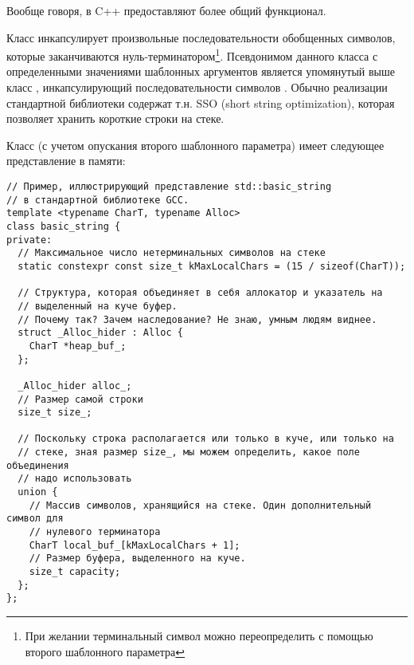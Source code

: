 Вообще говоря, в C++  предоставляют более общий функционал.

Класс  инкапсулирует произвольные последовательности
обобщенных символов, которые заканчиваются нуль-терминатором\footnote{При желании терминальный символ можно
переопределить с помощью второго шаблонного параметра}. Псевдонимом данного класса с определенными значениями
шаблонных аргументов является упомянутый выше класс ,
инкапсулирующий последовательности символов . Обычно реализации
стандартной библиотеки содержат т.н. SSO (short string optimization), которая позволяет хранить короткие строки на стеке.

Класс  (с учетом опускания второго шаблонного параметра) имеет следующее представление в памяти:
\begin{verbatim}
// Пример, иллюстрирующий представление std::basic_string
// в стандартной библиотеке GCC.
template <typename CharT, typename Alloc>
class basic_string {
private:
  // Максимальное число нетерминальных символов на стеке
  static constexpr const size_t kMaxLocalChars = (15 / sizeof(CharT));

  // Структура, которая объединяет в себя аллокатор и указатель на
  // выделенный на куче буфер.
  // Почему так? Зачем наследование? Не знаю, умным людям виднее.
  struct _Alloc_hider : Alloc {
    CharT *heap_buf_;
  };

  _Alloc_hider alloc_;
  // Размер самой строки
  size_t size_;

  // Поскольку строка располагается или только в куче, или только на
  // стеке, зная размер size_, мы можем определить, какое поле объединения
  // надо использовать
  union {
    // Массив символов, хранящийся на стеке. Один дополнительный символ для 
    // нулевого терминатора
    CharT local_buf_[kMaxLocalChars + 1];
    // Размер буфера, выделенного на куче.
    size_t capacity;
  };
};
\end{verbatim}